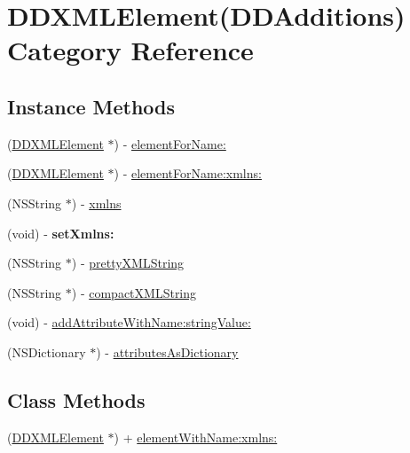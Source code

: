 \hypertarget{category_d_d_x_m_l_element_07_d_d_additions_08}{}\section{D\+D\+X\+M\+L\+Element(D\+D\+Additions) Category Reference}
\label{category_d_d_x_m_l_element_07_d_d_additions_08}
\subsection*{Instance Methods}
\begin{DoxyCompactItemize}
\item 
(\hyperlink{interface_d_d_x_m_l_element}{D\+D\+X\+M\+L\+Element} $\ast$) -\/ \hyperlink{category_d_d_x_m_l_element_07_d_d_additions_08_af62ac4ff2395956f1dd305efadf4c66c}{element\+For\+Name\+:}
\item 
(\hyperlink{interface_d_d_x_m_l_element}{D\+D\+X\+M\+L\+Element} $\ast$) -\/ \hyperlink{category_d_d_x_m_l_element_07_d_d_additions_08_a830d664d62774d3c6c63ba52bf9634ce}{element\+For\+Name\+:xmlns\+:}
\item 
(N\+S\+String $\ast$) -\/ \hyperlink{category_d_d_x_m_l_element_07_d_d_additions_08_a4d039c6cbaafa1dfcb64d83b362036ad}{xmlns}
\item 
\hypertarget{category_d_d_x_m_l_element_07_d_d_additions_08_a8652f5d90a5f99028d7af6967b198476}{}(void) -\/ {\bfseries set\+Xmlns\+:}\label{category_d_d_x_m_l_element_07_d_d_additions_08_a8652f5d90a5f99028d7af6967b198476}

\item 
(N\+S\+String $\ast$) -\/ \hyperlink{category_d_d_x_m_l_element_07_d_d_additions_08_ac0ac8be82bbe1d6d7bba84bc8f72a8d4}{pretty\+X\+M\+L\+String}
\item 
(N\+S\+String $\ast$) -\/ \hyperlink{category_d_d_x_m_l_element_07_d_d_additions_08_a3a9859998e5c70118de78b535595249e}{compact\+X\+M\+L\+String}
\item 
(void) -\/ \hyperlink{category_d_d_x_m_l_element_07_d_d_additions_08_a4633a5b7adc0664bd8bc695ff07cf85f}{add\+Attribute\+With\+Name\+:string\+Value\+:}
\item 
(N\+S\+Dictionary $\ast$) -\/ \hyperlink{category_d_d_x_m_l_element_07_d_d_additions_08_a6d7166bb73bc22b99605d756994562fe}{attributes\+As\+Dictionary}
\end{DoxyCompactItemize}
\subsection*{Class Methods}
\begin{DoxyCompactItemize}
\item 
(\hyperlink{interface_d_d_x_m_l_element}{D\+D\+X\+M\+L\+Element} $\ast$) + \hyperlink{category_d_d_x_m_l_element_07_d_d_additions_08_a2b4f520a9a839e5233ea11bd04e7f6bf}{element\+With\+Name\+:xmlns\+:}
\end{DoxyCompactItemize}



